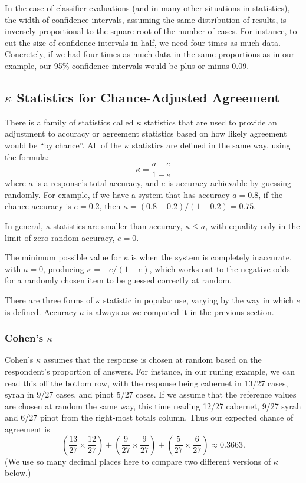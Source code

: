 In the case of classifier evaluations (and in many other situations in
statistics), the width of confidence intervals, assuming the same
distribution of results, is inversely proportional to the square root
of the number of cases.  For instance, to cut the size of confidence
intervals in half, we need four times as much data.  Concretely, if we
had four times as much data in the same proportions as in our example,
our 95\% confidence intervals would be plus or minus 0.09.  


\subsection{$\kappa$ Statistics for Chance-Adjusted Agreement}\label{section:classifier-eval-kappa}

There is a family of statistics called $\kappa$ statistics that are
used to provide an adjustment to accuracy or agreement statistics
based on how likely agreement would be ``by chance''.  All of
the $\kappa$ statistics are defined in the same way, using the
formula:
%
\begin{equation}\label{eq:kappa-statistic}
\kappa = \frac{a - e}{1 - e}
\end{equation}
%
where $a$ is a response's total accuracy, and $e$ is accuracy
achievable by guessing randomly.  For example, if we have a system
that has accuracy $a = 0.8$, if the chance accuracy is $e=0.2$, then
$\kappa = (0.8 - 0.2)/(1 - 0.2) = 0.75$.  

In general, $\kappa$ statistics are smaller than accuracy, $\kappa
\leq a$, with equality only in the limit of zero random accuracy,
$e=0$.

The minimum possible value for $\kappa$ is when the system is
completely inaccurate, with $a=0$, producing $\kappa = -e/(1-e)$,
which works out to the negative odds for a randomly chosen item
to be guessed correctly at random.

There are three forms of $\kappa$ statistic in popular use, varying by
the way in which $e$ is defined.  Accuracy $a$ is always as we
computed it in the previous section.

\subsubsection{Cohen's $\kappa$}

Cohen's $\kappa$ assumes that the response is chosen at random based
on the respondent's proportion of answers.  For instance, in our
runing example, we can read this off the bottom row, with the response
being cabernet in 13/27 cases, syrah in 9/27 cases, and pinot 5/27
cases.  If we assume that the reference values are chosen at random
the same way, this time reading 12/27 cabernet, 9/27 syrah and 6/27
pinot from the right-most totals column.  Thus our expected chance
of agreement is 
%
\begin{equation}
\left(\frac{13}{27} \times \frac{12}{27}\right)
+ \left(\frac{9}{27} \times \frac{9}{27}\right)
+ \left(\frac{5}{27} \times \frac{6}{27}\right)
\approx 0.3663.
\end{equation}
%
(We use so many decimal places here to compare two different versions
of $\kappa$ below.)  

